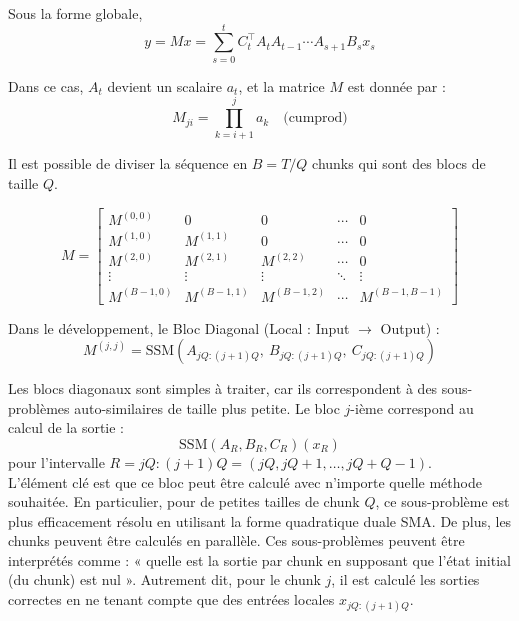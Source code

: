 Sous la forme globale, 
\begin{equation}
    y = Mx = \sum_{s=0}^t C_t^\top A_{t} A_{t-1} \cdots A_{s+1} B_s x_s
\end{equation}

\begin{definition}
Dans ce cas, $A_t$ devient un scalaire $a_t$, et la matrice $M$ est donnée par :
\begin{equation}
    M_{ji} = \prod_{k=i+1}^{j} a_k \quad \text{(cumprod)}
\end{equation}
\end{definition}

Il est possible de diviser la séquence en $B = T/Q$ chunks qui sont des blocs de taille $Q$.

\begin{equation}
M =
\begin{bmatrix}
M^{(0,0)} & 0        & 0        & \cdots & 0 \\
M^{(1,0)} & M^{(1,1)} & 0        & \cdots & 0 \\
M^{(2,0)} & M^{(2,1)} & M^{(2,2)} & \cdots & 0 \\
\vdots    & \vdots    & \vdots    & \ddots & \vdots \\
M^{(B-1,0)} & M^{(B-1,1)} & M^{(B-1,2)} & \cdots & M^{(B-1,B-1)}
\end{bmatrix}
\end{equation}

Dans le développement, le Bloc Diagonal (Local : Input $\rightarrow$ Output) :
\begin{equation}
    M^{(j,j)} = \text{SSM}(A_{jQ:(j+1)Q},\ B_{jQ:(j+1)Q},\ C_{jQ:(j+1)Q})
\end{equation}

Les blocs diagonaux sont simples à traiter, car ils correspondent à des sous-problèmes auto-similaires de taille plus petite. Le bloc $j$-ième correspond au calcul de la sortie :
\[ 
\text{SSM}(A_R, B_R, C_R)(x_R)
\]
pour l'intervalle $R = jQ : (j + 1)Q = (jQ, jQ + 1, \ldots, jQ + Q - 1)$.\\


L'élément clé est que ce bloc peut être calculé avec n'importe quelle méthode souhaitée. En particulier, pour de petites tailles de chunk $Q$, ce sous-problème est plus efficacement résolu en utilisant la forme quadratique duale SMA. De plus, les chunks peuvent être calculés en parallèle. Ces sous-problèmes peuvent être interprétés comme : « quelle est la sortie par chunk en supposant que l'état initial (du chunk) est nul ». Autrement dit, pour le chunk $j$, il est calculé les sorties correctes en ne tenant compte que des entrées locales $x_{jQ : (j + 1)Q}$.\\

